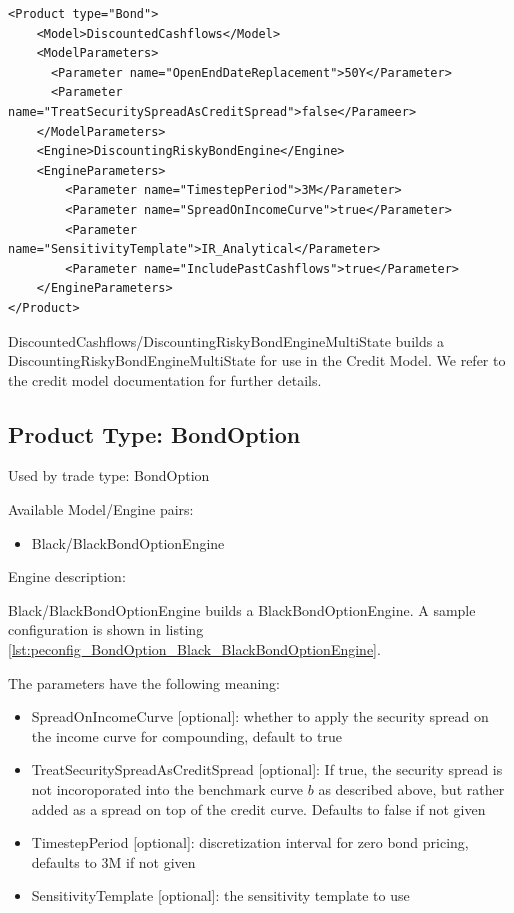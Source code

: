 \begin{longlisting}
\begin{verbatim}
<Product type="Bond">
    <Model>DiscountedCashflows</Model>
    <ModelParameters>
      <Parameter name="OpenEndDateReplacement">50Y</Parameter>
      <Parameter name="TreatSecuritySpreadAsCreditSpread">false</Parameer>
    </ModelParameters>
    <Engine>DiscountingRiskyBondEngine</Engine>
    <EngineParameters>
        <Parameter name="TimestepPeriod">3M</Parameter>
        <Parameter name="SpreadOnIncomeCurve">true</Parameter>
        <Parameter name="SensitivityTemplate">IR_Analytical</Parameter>
        <Parameter name="IncludePastCashflows">true</Parameter>
    </EngineParameters>
</Product>
\end{verbatim}
\caption{Configuration for Product Bond, Model DiscountedCashflows, Engine DiscountingRiskyBondEngine}
\label{lst:peconfig_Bond_DiscountedCashflows_DiscountingRiskyBondEngine}
\end{longlisting}

DiscountedCashflows/DiscountingRiskyBondEngineMultiState builds a DiscountingRiskyBondEngineMultiState for use in the
Credit Model. We refer to the credit model documentation for further details.

\subsection{Product Type: BondOption}

Used by trade type: BondOption

Available Model/Engine pairs:

\begin{itemize}
\item Black/BlackBondOptionEngine
\end{itemize}

Engine description:

Black/BlackBondOptionEngine builds a BlackBondOptionEngine. A sample configuration is shown in listing
\ref{lst:peconfig_BondOption_Black_BlackBondOptionEngine}.

The parameters have the following meaning:

\begin{itemize}
\item SpreadOnIncomeCurve [optional]: whether to apply the security spread on the income curve for compounding, default to true
\item TreatSecuritySpreadAsCreditSpread [optional]: If true, the security spread is not incoroporated into the benchmark curve $b$
  as described above, but rather added as a spread on top of the credit curve. Defaults to false if not given
\item TimestepPeriod [optional]: discretization interval for zero bond pricing, defaults to 3M if not given
\item SensitivityTemplate [optional]: the sensitivity template to use
\end{itemize}

